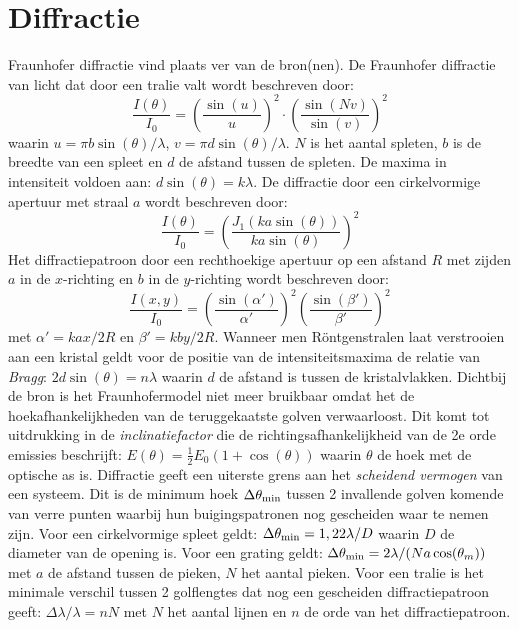\documentclass[twoside]{report}
\begin{document}
\section{Diffractie}
Fraunhofer diffractie vind plaats ver van de bron(nen). De Fraunhofer
diffractie van licht dat door een tralie valt wordt beschreven door:
\[
\frac{I(\theta)}{I_0}=\left(\frac{\sin(u)}{u}\right)^2\cdot
\left(\frac{\sin(Nv)}{\sin(v)}\right)^2
\]
waarin $u=\pi b\sin(\theta)/\lambda$, $v=\pi d\sin(\theta)/\lambda$. $N$ is
het aantal spleten, $b$ is de breedte van een spleet en $d$ de afstand tussen
de spleten. De maxima in intensiteit voldoen aan: $d\sin(\theta)=k\lambda$.
\npar
De diffractie door een cirkelvormige apertuur met straal $a$ wordt beschreven
door:
\[
\frac{I(\theta)}{I_0}=\left(\frac{J_1(ka\sin(\theta))}{ka\sin(\theta)}\right)^2
\]
Het diffractiepatroon door een rechthoekige apertuur op een afstand $R$ met
zijden $a$ in de $x$-richting en $b$ in de $y$-richting wordt beschreven door:
\[
\frac{I(x,y)}{I_0}=\left(\frac{\sin(\alpha')}{\alpha'}\right)^2\left(\frac{\sin(\beta')}{\beta'}\right)^2
\]
met $\alpha'=kax/2R$ en $\beta'=kby/2R$.
\npar
Wanneer men R\"ontgenstralen laat verstrooien aan een kristal geldt
voor de positie van de intensiteitsmaxima de relatie van {\it Bragg}:
$2d\sin(\theta)=n\lambda$ waarin $d$ de afstand is tussen de kristalvlakken.
\npar
Dichtbij de bron is het Fraunhofermodel niet meer bruikbaar omdat het de
hoekafhankelijkheden van de teruggekaatste golven verwaarloost. Dit komt tot
uitdrukking in de {\it inclinatiefactor} die de richtingsafhankelijkheid van
de 2e orde emissies beschrijft: $E(\theta)=\frac{1}{2}E_0(1+\cos(\theta))$
waarin $\theta$ de hoek met de optische as is.
\npar
Diffractie geeft een uiterste grens aan het {\it scheidend vermogen} van een
systeem. Dit is de minimum hoek $\Delta\theta_{\rm min}$ tussen 2 invallende
golven komende van verre punten waarbij hun buigingspatronen nog gescheiden
waar te nemen zijn. Voor een cirkelvormige spleet geldt: $\Delta\theta_{\rm
min}=1,22\lambda/D$ waarin $D$ de diameter van de opening is.
\npar
Voor een grating geldt: $\Delta\theta_{\rm min}=2\lambda/(Na\cos(\theta_m))$
met $a$ de afstand tussen de pieken, $N$ het aantal pieken. Voor een tralie
is het minimale verschil tussen 2 golflengtes dat nog een gescheiden
diffractiepatroon geeft: $\Delta\lambda/\lambda=nN$ met $N$ het aantal lijnen
en $n$ de orde van het diffractiepatroon.
\end{document}
